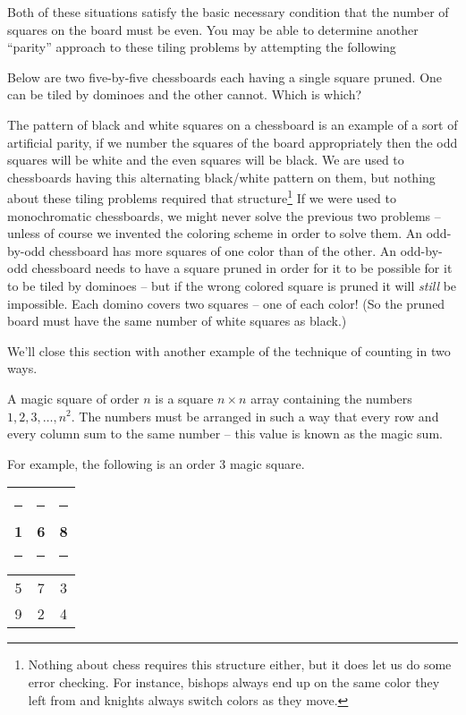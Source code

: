 Both of these situations satisfy the basic necessary condition that 
the number of squares on the board must be even.  You may be able
to determine another ``parity'' approach to these tiling problems
by attempting the following

\begin{exer}
Below are two five-by-five chessboards each having a single
square pruned.  One can be tiled by dominoes and the other
cannot.  Which is which?

 
\begin{center}

\end{center}

\end{exer}

The pattern of black and white squares on a chessboard is an 
example of a sort of artificial parity, if we number the squares
of the board appropriately then the odd squares will be white and
the even squares will be black.  We are used to chessboards having
this alternating black/white pattern on them, but nothing about these
tiling problems required that structure\footnote{Nothing about chess
requires this structure either, but it does let us do some error checking.
For instance, bishops always end up on the same color they left from and 
knights always switch colors as they move.}  If we were used to monochromatic chessboards, we might never solve the previous two problems -- unless
of course we invented the coloring scheme in order to solve them.  
An odd-by-odd chessboard has more squares of one color than of the other.
An odd-by-odd chessboard needs to have a square pruned in order for it to
be possible for it to be tiled by dominoes -- but if the wrong colored
square is pruned it will \emph{still} be impossible.  Each domino covers
two squares -- one of each color!  (So the pruned board must have the 
same number of white squares as black.) 

We'll close this section with another example of the technique of
counting in two ways.   

A  magic square of order $n$ is a square 
$n \times n$ array 
containing the numbers $1, 2, 3, \ldots , n^2$.  The numbers must 
be arranged in such a way that every row and every column sum to
the same number -- this value is known as the magic sum. 

For example, the following is an order $3$ magic square.

\begin{center}
\begin{tabular}{c|c|c}
\rule[-4pt]{0pt}{20pt}\rule{5pt}{0pt} 1 \rule{5pt}{0pt} & \rule{5pt}{0pt} 6 \rule{5pt}{0pt} & \rule{5pt}{0pt} 8 \rule{5pt}{0pt} \\ \hline
\rule[-4pt]{0pt}{20pt} 5 & 7 & 3 \\ \hline
\rule[-4pt]{0pt}{20pt} 9 & 2 & 4 \\
\end{tabular}
\end{center}

